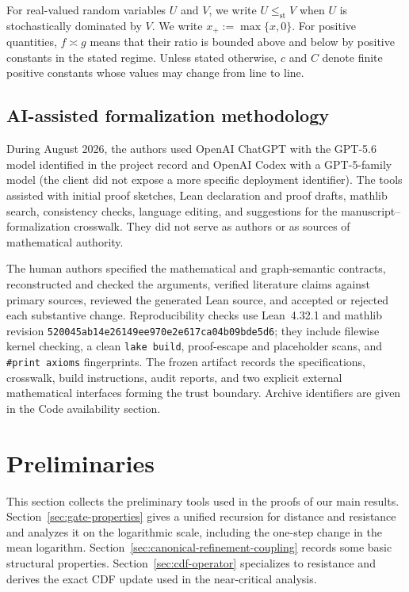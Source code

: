 \documentclass[a4paper,fleqn]{cas-sc}
\newif\ifshowrevisions
\newenvironment{revision}{\begingroup\ifshowrevisions\color{blue}\fi}{\endgroup}
\numberwithin{equation}{section}
\theoremstyle{plain}
\theoremstyle{definition}
\newcommand{\stle}{\le_{\mathrm{st}}}
\begin{document}
For real-valued random variables $U$ and $V$, we write
$U\stle V$ when $U$ is stochastically dominated by $V$.  We write
$x_+:=\max\{x,0\}$.   For positive quantities, $f\asymp g$
means that their ratio is bounded above and below by positive constants in
the stated regime.  Unless stated otherwise, $c$ and $C$ denote finite
positive constants whose values may change from line to line.

\begin{revision}
\subsection*{AI-assisted formalization methodology}
During August 2026, the authors used OpenAI ChatGPT with the GPT-5.6 model
identified in the project record and OpenAI Codex with a GPT-5-family model
(the client did not expose a more specific deployment identifier). The tools
assisted with initial proof sketches, Lean declaration and proof drafts,
mathlib search, consistency checks, language editing, and suggestions for the
manuscript--formalization crosswalk. They did not serve as authors or as
sources of mathematical authority.

The human authors specified the mathematical and graph-semantic contracts,
reconstructed and checked the arguments, verified literature claims against
primary sources, reviewed the generated Lean source, and accepted or rejected
each substantive change. Reproducibility checks use Lean~4.32.1 and mathlib
revision \texttt{520045ab14e26149ee970e2e617ca04b09bde5d6}; they include
filewise kernel checking, a clean \texttt{lake build}, proof-escape and
placeholder scans, and \texttt{\#print axioms} fingerprints. The frozen
artifact records the specifications, crosswalk, build instructions, audit
reports, and two explicit external mathematical interfaces forming the trust
boundary. Archive identifiers are given in the Code availability section.
\end{revision}

\section{Preliminaries}
\label{sec:preliminaries}

This section collects the preliminary tools used in the proofs of our main
results.  Section~\ref{sec:gate-properties} gives a unified recursion for
distance and resistance and analyzes it on the logarithmic scale, including
the one-step change in the mean logarithm.
Section~\ref{sec:canonical-refinement-coupling} records some basic structural
properties.
Section~\ref{sec:cdf-operator} specializes to resistance and derives the exact
CDF update used in the near-critical analysis.
\end{document}
